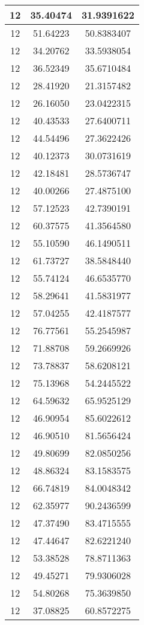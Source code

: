 \documentclass[
]{book}
\begin{document}
\begin{tabular}{c|c|c}
\hline
12 & 35.40474 & 31.9391622\\
\hline
12 & 51.64223 & 50.8383407\\
\hline
12 & 34.20762 & 33.5938054\\
\hline
12 & 36.52349 & 35.6710484\\
\hline
12 & 28.41920 & 21.3157482\\
\hline
12 & 26.16050 & 23.0422315\\
\hline
12 & 40.43533 & 27.6400711\\
\hline
12 & 44.54496 & 27.3622426\\
\hline
12 & 40.12373 & 30.0731619\\
\hline
12 & 42.18481 & 28.5736747\\
\hline
12 & 40.00266 & 27.4875100\\
\hline
12 & 57.12523 & 42.7390191\\
\hline
12 & 60.37575 & 41.3564580\\
\hline
12 & 55.10590 & 46.1490511\\
\hline
12 & 61.73727 & 38.5848440\\
\hline
12 & 55.74124 & 46.6535770\\
\hline
12 & 58.29641 & 41.5831977\\
\hline
12 & 57.04255 & 42.4187577\\
\hline
12 & 76.77561 & 55.2545987\\
\hline
12 & 71.88708 & 59.2669926\\
\hline
12 & 73.78837 & 58.6208121\\
\hline
12 & 75.13968 & 54.2445522\\
\hline
12 & 64.59632 & 65.9525129\\
\hline
12 & 46.90954 & 85.6022612\\
\hline
12 & 46.90510 & 81.5656424\\
\hline
12 & 49.80699 & 82.0850256\\
\hline
12 & 48.86324 & 83.1583575\\
\hline
12 & 66.74819 & 84.0048342\\
\hline
12 & 62.35977 & 90.2436599\\
\hline
12 & 47.37490 & 83.4715555\\
\hline
12 & 47.44647 & 82.6221240\\
\hline
12 & 53.38528 & 78.8711363\\
\hline
12 & 49.45271 & 79.9306028\\
\hline
12 & 54.80268 & 75.3639850\\
\hline
12 & 37.08825 & 60.8572275\\

\end{tabular}
\end{document}
